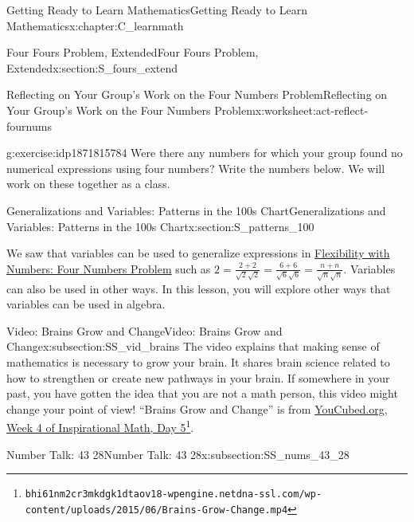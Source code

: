 \documentclass[oneside,10pt,]{book}
\numberwithin{equation}{chapter}
\begin{document}
\begin{chapterptx}{Getting Ready to Learn Mathematics}{}{Getting Ready to Learn Mathematics}{}{}{x:chapter:C_learnmath}
\begin{sectionptx}{Four Fours Problem, Extended}{}{Four Fours Problem, Extended}{}{}{x:section:S_fours_extend}
\begin{worksheet-subsection}{Reflecting on Your Group's Work on the Four Numbers Problem}{}{Reflecting on Your Group's Work on the Four Numbers Problem}{}{}{x:worksheet:act-reflect-fournums}
\begin{divisionexercise}{4}{}{}{g:exercise:idp1871815784}
Were there any numbers for which your group found no numerical expressions using four numbers? Write the numbers below. We will work on these together as a class.%
\end{divisionexercise}%
\end{worksheet-subsection}
\restoregeometry
\end{sectionptx}
%
%
\typeout{************************************************}
\typeout{************************************************}
%
\begin{sectionptx}{Generalizations and Variables: Patterns in the 100s Chart}{}{Generalizations and Variables: Patterns in the 100s Chart}{}{}{x:section:S_patterns_100}
\begin{introduction}{}%
We saw that variables can be used to generalize expressions in \hyperref[x:worksheet:act-four-nums-prob]{Flexibility with Numbers: Four Numbers Problem} such as \(2=\frac{2+2}{\sqrt2\sqrt2}=\frac{6+6}{\sqrt6\sqrt6}=\frac{n+n}{\sqrt n\sqrt n}\). Variables can also be used in other ways. In this lesson, you will explore other ways that variables can be used in algebra.%
\end{introduction}%
%
%
\typeout{************************************************}
\typeout{************************************************}
%
\begin{subsectionptx}{Video: Brains Grow and Change}{}{Video: Brains Grow and Change}{}{}{x:subsection:SS_vid_brains}
The video explains that making sense of mathematics is necessary to grow your brain. It shares brain science related to how to strengthen or create new pathways in your brain. If somewhere in your past, you have gotten the idea that you are not a math person, this video might change your point of view! ``Brains Grow and Change'' is from \href{https://bhi61nm2cr3mkdgk1dtaov18-wpengine.netdna-ssl.com/wp-content/uploads/2015/06/Brains-Grow-Change.mp4}{YouCubed.org, Week 4 of Inspirational Math, Day 5}\footnote{\nolinkurl{bhi61nm2cr3mkdgk1dtaov18-wpengine.netdna-ssl.com/wp-content/uploads/2015/06/Brains-Grow-Change.mp4}\label{g:fn:idp1871823208}}.%
\end{subsectionptx}
%
%
\typeout{************************************************}
\typeout{************************************************}
%
\begin{subsectionptx}{Number Talk: 43 \textminus{} 28}{}{Number Talk: 43 \textminus{} 28}{}{}{x:subsection:SS_nums_43_28}

\end{subsectionptx}
\end{sectionptx}
\end{chapterptx}
\end{document}
